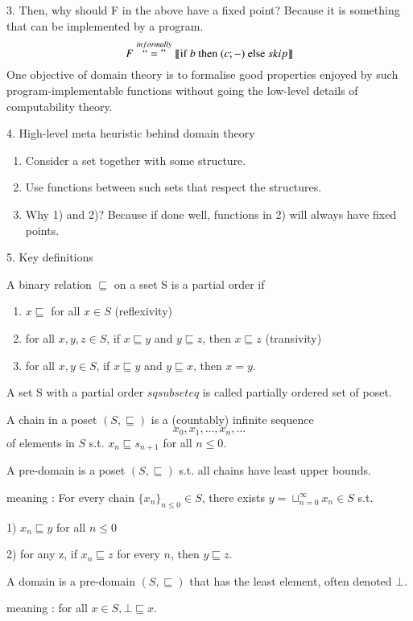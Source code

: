 \documentclass{report}[12pt]
\begin{document}
3. Then, why should F in the above have a fixed point? Because it is something that can be implemented by a program.
\[F\stackrel{informally}{``="}\llbracket \text{if }b\text{ then }(c;-)\text{ else }skip \rrbracket\]
One objective of domain theory is to formalise good properties enjoyed by such program-implementable functions without going the low-level details of computability theory.

4. High-level meta heuristic behind domain theory
\begin{enumerate}
    \item Consider a set together with some structure.
    \item Use functions between such sets that respect the structures.
    \item Why 1) and 2)? Because if done well, functions in 2) will always have fixed points.
\end{enumerate}
5. Key definitions
\begin{definition}
    A binary relation $\sqsubseteq$ on a sset S is a partial order if
    \begin{enumerate}
        \item $x\sqsubseteq$ for all $x \in S$ (reflexivity)
        \item for all $x, y, z\in S$, if $x\sqsubseteq y$ and $y \sqsubseteq z$, then $x \sqsubseteq z$ (transivity)
        \item for all $x, y \in S$, if $x \sqsubseteq y$ and $y \sqsubseteq x$, then $x=y$.
    \end{enumerate}
    A set S with a partial order $sqsubseteq$ is called partially ordered set of poset.
\end{definition}
\begin{definition}
    A chain in a poset $(S, \sqsubseteq)$ is a (countably) infinite sequence
    \[x_0, x_1, \ldots, x_n, \ldots\]
    of elements in $S$ s.t. $x_n \sqsubseteq s_{n+1}$ for all $n \le 0$.
\end{definition}
\begin{definition}
    A pre-domain is a poset $(S, \sqsubseteq)$ s.t. all chains have least upper bounds.

    meaning : For every chain $\{x_n\}_{n\le 0} \in S$, there exists $y=\sqcup_{n=0}^\infty x_n \in S$ s.t.

    1) $x_n \sqsubseteq y$ for all $n \le 0$

    2) for any z, if $x_n \sqsubseteq z$ for every $n$, then $y \sqsubseteq z$.
\end{definition}
\begin{definition}
    A domain is a pre-domain $(S, \sqsubseteq)$ that has the least element, often denoted $\bot$.

    meaning : for all $x \in S, \bot \sqsubseteq x$.
\end{definition}
\end{document}
